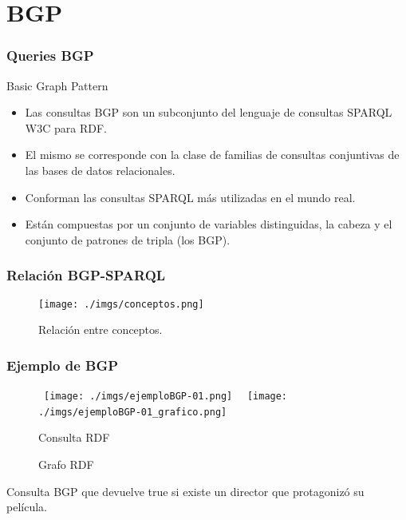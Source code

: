 \documentclass{beamer}
\begin{document}
\section{BGP}
\begin{frame}
\frametitle{Queries BGP}
\begin{exampleblock}{Basic Graph Pattern}
\begin{itemize}
\item<1-> Las consultas BGP son un subconjunto del lenguaje de consultas SPARQL W3C para RDF. 
\item<2-> El mismo se corresponde con la clase de familias de consultas conjuntivas de las bases de datos relacionales. 
\item<3-> Conforman las consultas SPARQL más utilizadas en el mundo real.
\item<4-> Están compuestas por un conjunto de variables distinguidas, la cabeza y el conjunto de patrones de tripla (los BGP).
\end{itemize}
\end{exampleblock}
\end{frame}

\begin{frame}
\frametitle{Relación BGP-SPARQL}
\begin{figure}[H] %
\begin{center}
\texttt{[image: ./imgs/conceptos.png]}
\caption{Relación entre conceptos.}
\end{center}
\end{figure}
\end{frame}
\begin{frame}
\frametitle{Ejemplo de BGP}
\begin{figure}
        \hbox{%
                \texttt{[image: ./imgs/ejemploBGP-01.png]}%
        }%
        \hbox{%
                \texttt{[image: ./imgs/ejemploBGP-01\_grafico.png]}%
        }%
        \ifdim\ht0>\ht2
                \setbox0\hbox{%
                        \texttt{[image: ./imgs/ejemploBGP-01.png]}%
                }%
        \else
                \setbox2\hbox{%
                        \texttt{[image: ./imgs/ejemploBGP-01\_grafico.png]}%
                }%
        \fi
        \noindent
        \parbox{.35\textwidth}{%
                \centering
                \caption{Consulta RDF}
                \label{fg:methods}
        }%
        \hfil
        \parbox{.35\textwidth}{%
                \centering
                \caption{Grafo RDF}
                \label{fg:method_detail}
        }
\end{figure}
\vspace*{1.2cm}
Consulta BGP que devuelve true si existe un director que protagonizó su película.
\end{frame}
\end{document}
